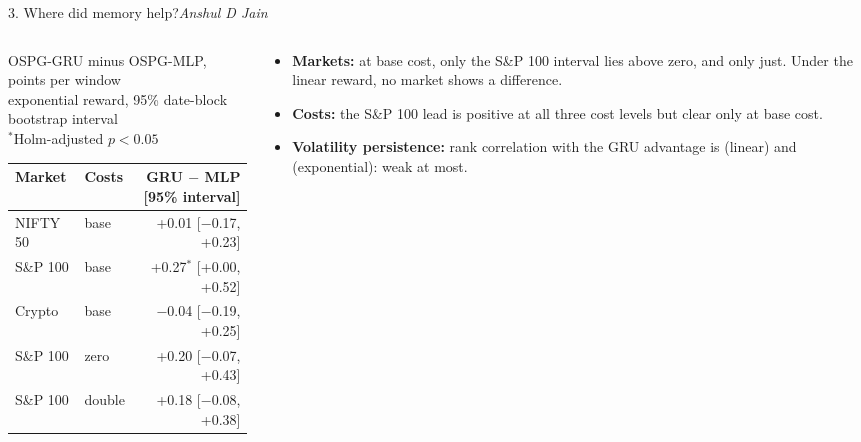 \documentclass[aspectratio=169,11pt]{beamer}
\newcommand{\by}[1]{\hfill{\normalfont\small\itshape #1}}
\begin{document}
\begin{frame}{3. Where did memory help?\by{Anshul D Jain}}
\begin{columns}[T]
\begin{column}{.54\textwidth}\centering
\scriptsize OSPG-GRU minus OSPG-MLP, points per window\\
exponential reward, 95\% date-block bootstrap interval\\
$^{*}$Holm-adjusted $p<0.05$\\[4pt]
\begin{tabular}{llr}
\toprule
Market & Costs & GRU $-$ MLP [95\% interval]\\
\midrule
NIFTY 50 & base & +0.01 [$-$0.17, +0.23]\\
S\&P 100 & base & +0.27$^{*}$ [+0.00, +0.52]\\
Crypto & base & $-$0.04 [$-$0.19, +0.25]\\
\midrule
S\&P 100 & zero & +0.20 [$-$0.07, +0.43]\\
S\&P 100 & double & +0.18 [$-$0.08, +0.38]\\
\bottomrule
\end{tabular}
\end{column}
\begin{column}{.42\textwidth}
\begin{itemize}\small
\item \textbf{Markets:} at base cost, only the S\&P 100 interval lies above zero, and only just.
  Under the linear reward, no market shows a difference.
\item \textbf{Costs:} the S\&P 100 lead is positive at all three cost levels but clear only at
  base cost.
\item \textbf{Volatility persistence:} rank correlation with the GRU advantage is
  \perslinear{} (linear) and \persexponential{} (exponential): weak at most.
\end{itemize}
\end{column}
\end{columns}
\end{frame}
\end{document}
